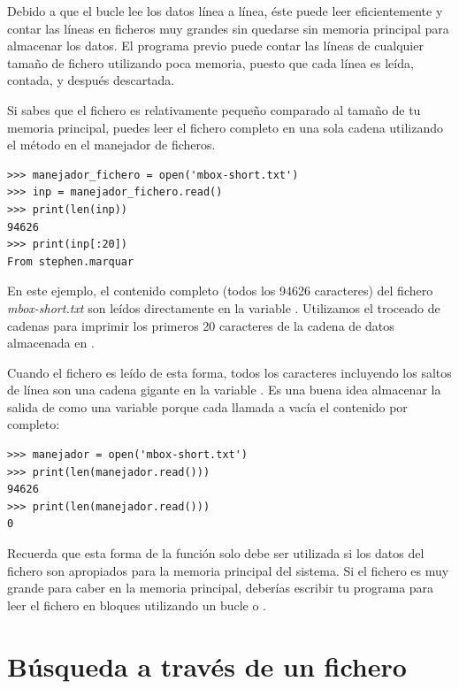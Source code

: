 Debido a que el bucle  lee los datos línea a línea, éste
puede leer eficientemente y contar las líneas en ficheros muy grandes
sin quedarse sin memoria principal para almacenar los datos. El programa
previo puede contar las líneas de cualquier tamaño de fichero utilizando
poca memoria, puesto que cada línea es leída, contada, y después
descartada.

Si sabes que el fichero es relativamente pequeño comparado al tamaño de
tu memoria principal, puedes leer el fichero completo en una sola cadena
utilizando el método  en el manejador de ficheros.

\begin{Verbatim}[frame=single]
>>> manejador_fichero = open('mbox-short.txt')
>>> inp = manejador_fichero.read()
>>> print(len(inp))
94626
>>> print(inp[:20])
From stephen.marquar
\end{Verbatim}

En este ejemplo, el contenido completo (todos los 94626 caracteres) del
fichero \emph{mbox-short.txt} son leídos directamente en la variable
. Utilizamos el troceado de cadenas para imprimir los
primeros 20 caracteres de la cadena de datos almacenada en .

Cuando el fichero es leído de esta forma, todos los caracteres
incluyendo los saltos de línea son una cadena gigante en la variable
. Es una buena idea almacenar la salida de 
como una variable porque cada llamada a  vacía el contenido
por completo:

\begin{Verbatim}[frame=single]
>>> manejador = open('mbox-short.txt')
>>> print(len(manejador.read()))
94626
>>> print(len(manejador.read()))
0
\end{Verbatim}

Recuerda que esta forma de la función  solo debe ser
utilizada si los datos del fichero son apropiados para la memoria
principal del sistema. Si el fichero es muy grande para caber en la
memoria principal, deberías escribir tu programa para leer el fichero en
bloques utilizando un bucle  o .

\hypertarget{buxfasqueda-a-travuxe9s-de-un-fichero}{%
\section{Búsqueda a través de un
fichero}\label{buxfasqueda-a-travuxe9s-de-un-fichero}}

